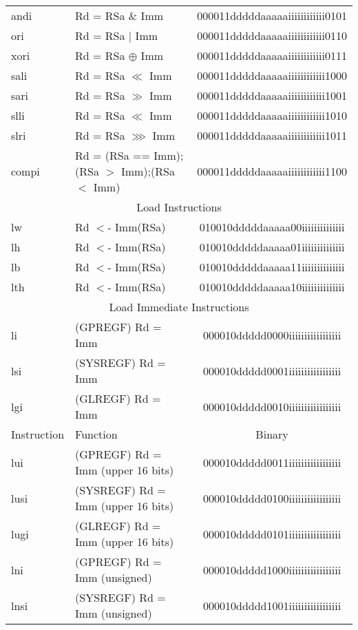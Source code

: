 \documentclass[letterpaper, 11pt]{article}
\begin{document}
\begin{center}
\begin{longtable}{|l|l|c|}
			andi		& Rd = RSa \& Imm								& 000011dddddaaaaaiiiiiiiiiiii0101 \\
			ori			& Rd = RSa $|$ Imm 								& 000011dddddaaaaaiiiiiiiiiiii0110 \\
			xori		& Rd = RSa $\oplus$ Imm 						& 000011dddddaaaaaiiiiiiiiiiii0111 \\
			sali		& Rd = RSa $\ll$ Imm 							& 000011dddddaaaaaiiiiiiiiiiii1000 \\
			sari		& Rd = RSa $\gg$ Imm 							& 000011dddddaaaaaiiiiiiiiiiii1001 \\
			slli		& Rd = RSa $\ll$ Imm 							& 000011dddddaaaaaiiiiiiiiiiii1010 \\
			slri		& Rd = RSa $ \ggg  $ Imm 						& 000011dddddaaaaaiiiiiiiiiiii1011 \\
			compi		& Rd = (RSa == Imm);(RSa $>$ Imm);(RSa $<$ Imm)	& 000011dddddaaaaaiiiiiiiiiiii1100 \\
			\hline
			\multicolumn{3}{|c|}{Load Instructions} \\ \hline
			lw			& Rd $<$- Imm(RSa)								& 010010dddddaaaaa00iiiiiiiiiiiiii \\
			lh			& Rd $<$- Imm(RSa)								& 010010dddddaaaaa01iiiiiiiiiiiiii \\
			lb			& Rd $<$- Imm(RSa)								& 010010dddddaaaaa11iiiiiiiiiiiiii \\
			lth			& Rd $<$- Imm(RSa)								& 010010dddddaaaaa10iiiiiiiiiiiiii \\
			\hline
			\multicolumn{3}{|c|}{Load Immediate Instructions} \\ \hline
			li			& (GPREGF) Rd = Imm								& 000010ddddd0000iiiiiiiiiiiiiiiii \\
			lsi			& (SYSREGF) Rd = Imm							& 000010ddddd0001iiiiiiiiiiiiiiiii \\
			lgi			& (GLREGF) Rd = Imm								& 000010ddddd0010iiiiiiiiiiiiiiiii \\
			\hline
			Instruction & Function 										& Binary \\ \hline
			lui			& (GPREGF) Rd = Imm	(upper 16 bits)				& 000010ddddd0011iiiiiiiiiiiiiiiii \\
			lusi		& (SYSREGF) Rd = Imm (upper 16 bits)			& 000010ddddd0100iiiiiiiiiiiiiiiii \\
			lugi		& (GLREGF) Rd = Imm	 (upper 16 bits)			& 000010ddddd0101iiiiiiiiiiiiiiiii \\
			lni			& (GPREGF) Rd = Imm	(unsigned)					& 000010ddddd1000iiiiiiiiiiiiiiiii \\
			lnsi		& (SYSREGF) Rd = Imm (unsigned)					& 000010ddddd1001iiiiiiiiiiiiiiiii \\

\end{longtable}
\end{center}
\end{document}
